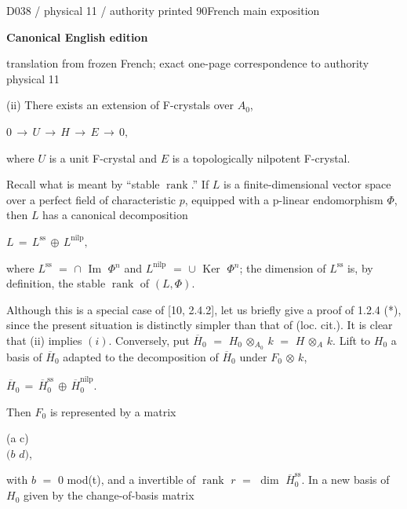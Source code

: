 \documentclass[9pt]{article}
\newcommand{\CanonText}[1]{\par{\fontsize{8.0}{9.35}\selectfont\RaggedRight #1\par}\vspace{2.2pt}}
\newcommand{\CanonDisplay}[1]{\par\vspace{1.2pt}\begin{center}{\fontsize{7.2}{8.4}\selectfont\(\displaystyle #1\)}\end{center}\vspace{1.2pt}}
\newenvironment{CanonMathBlock}{\par\vspace{1.2pt}\begin{center}\fontsize{6.8}{8.0}\selectfont\(\displaystyle}{\)\end{center}\vspace{1.2pt}}
\newcommand{\LayerTitle}{Canonical English edition}
\begin{document}
\noindent\begin{minipage}[t][\dimexpr\textheight-5pt\relax][t]{\textwidth}
{\sffamily\fontsize{7.3}{8.2}\selectfont\color{Quiet} D038 / physical 11 / authority printed 90\hfill French main exposition}
\par{}\vspace{4.5pt}
{\sffamily\fontsize{10.4}{11.6}\selectfont\bfseries\color{Accent} \LayerTitle}
\par{\sffamily\fontsize{6.7}{7.7}\selectfont\color{Quiet} translation from frozen French; exact one-page correspondence to authority physical 11}
\vspace{5pt}
\CanonText{(ii) There exists an extension of F-crystals over \(A_{0}\),}
\CanonDisplay{0\,\to{}\,U\,\to{}\,H\,\to{}\,E\,\to{}\,0,}
\CanonText{where \(U\) is a unit F-crystal and \(E\) is a topologically nilpotent F-crystal.}
\CanonText{Recall what is meant by “stable \(\operatorname{rank}\).” If \(L\) is a finite-dimensional vector space over a perfect field of characteristic \(p\), equipped with a p-linear endomorphism \(\Phi{}\), then \(L\) has a canonical decomposition}
\CanonDisplay{L\,=\,L^{\mathrm{ss}}\,\oplus{}\,L^{\mathrm{nilp}},}
\CanonText{where \(L^{\mathrm{ss}}\) \(=\) \(\cap{}\) \(\operatorname{Im}\) \(\Phi{}^{n}\) and \(L^{\mathrm{nilp}}\) \(=\) \(\cup{}\) \(\operatorname{Ker}\) \(\Phi{}^{n}\); the dimension of \(L^{\mathrm{ss}}\) is, by definition, the stable \(\operatorname{rank}\) of \((L,\Phi{})\).}
\CanonText{Although this is a special case of [10, 2.4.2], let us briefly give a proof of 1.2.4 (*), since the present situation is distinctly simpler than that of (loc. cit.). It is clear that (ii) implies \((i)\). Conversely, put \(\overline{H}_{0}\) \(=\) \(H_{0}\) \(\otimes{}_{A_{0}}\) \(k\) \(=\) \(H\) \(\otimes{}_{A}\) \(k\). Lift to \(H_{0}\) a basis of \(\overline{H}_{0}\) adapted to the decomposition of \(\overline{H}_{0}\) under \(F_{0}\) \(\otimes{}\) \(k\),}
\CanonDisplay{\overline{H}_{0}\,=\,\overline{H}_{0}^{\mathrm{ss}}\,\oplus{}\,\overline{H}_{0}^{\mathrm{nilp}}.}
\CanonText{Then \(F_{0}\) is represented by a matrix}
\CanonText{(a c)\\\((b\) \(d)\),}
\CanonText{with \(b\) \(=\) 0 mod(t), and a invertible of \(\operatorname{rank}\) \(r\) \(=\) \(\operatorname{dim}\) \(\overline{H}_{0}^{\mathrm{ss}}\). In a new basis of \(H_{0}\) given by the change-of-basis matrix}
\begin{CanonMathBlock}
\begin{aligned}

\end{aligned}
\end{CanonMathBlock}
\end{minipage}
\end{document}

